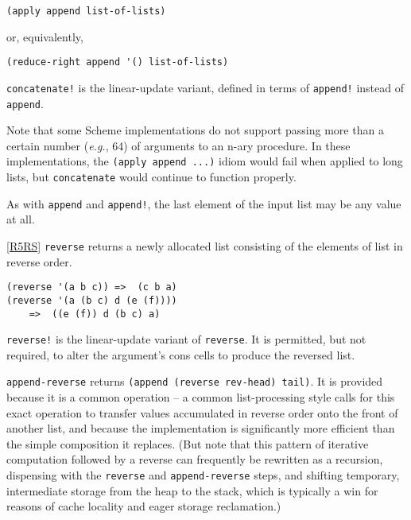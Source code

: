 \begin{description}
\begin{verbatim}
(apply append list-of-lists)
\end{verbatim}

or, equivalently,

\begin{verbatim}
(reduce-right append '() list-of-lists)
\end{verbatim}

\texttt{concatenate!} is the linear-update variant, defined in terms of
\texttt{append!} instead of \texttt{append}.

Note that some Scheme implementations do not support passing more than a
certain number (\emph{e.g.}, 64) of arguments to an n-ary procedure. In
these implementations, the \texttt{(apply\ append\ ...)} idiom would
fail when applied to long lists, but \texttt{concatenate} would continue
to function properly.

As with \texttt{append} and \texttt{append!}, the last element of the
input list may be any value at all.
\item[ \href{}{} \texttt{reverse~} list -\textgreater{} list\\
\href{}{} \texttt{reverse!} list -\textgreater{} list ]
{[}\protect\hyperlink{R5RS}{R5RS}{]} \texttt{reverse} returns a newly
allocated list consisting of the elements of list in reverse order.

\begin{verbatim}
(reverse '(a b c)) =>  (c b a)
(reverse '(a (b c) d (e (f))))
    =>  ((e (f)) d (b c) a)
\end{verbatim}

\texttt{reverse!} is the linear-update variant of \texttt{reverse}. It
is permitted, but not required, to alter the argument's cons cells to
produce the reversed list.
\item[ \href{}{} \texttt{append-reverse~~}rev-head tail -\textgreater{}
list\\
\href{}{} \texttt{append-reverse!~}rev-head tail -\textgreater{} list ]
\texttt{append-reverse} returns
\texttt{(append\ (reverse\ rev-head)\ tail)}. It is provided because it
is a common operation -- a common list-processing style calls for this
exact operation to transfer values accumulated in reverse order onto the
front of another list, and because the implementation is significantly
more efficient than the simple composition it replaces. (But note that
this pattern of iterative computation followed by a reverse can
frequently be rewritten as a recursion, dispensing with the
\texttt{reverse} and \texttt{append-reverse} steps, and shifting
temporary, intermediate storage from the heap to the stack, which is
typically a win for reasons of cache locality and eager storage
reclamation.)


\end{description}
